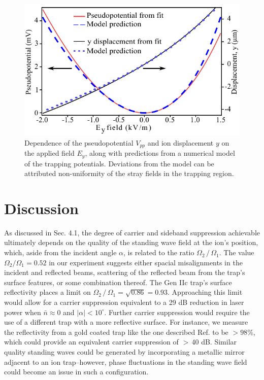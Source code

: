 \begin{figure}[htb]
    \begin{center}
        \includegraphics{figures/4/Fig_PPfit}
        \caption{\label{fig:model} Dependence of the pseudopotential $V_{pp}$ and ion displacement $y$ on the applied field $E_y$, along with predictions from a numerical model of the trapping potentials. Deviations from the model can be attributed non-uniformity of the stray fields in the trapping region. }
    \end{center}
\end{figure}




\section{Discussion}

As discussed in Sec. 4.1, the degree of carrier and sideband suppression achievable ultimately depends on the quality of the standing wave field at the ion's position, which, aside from the incident angle $\alpha$, is related to the ratio $\Omega_2\, / \, \Omega_1$. The value $\Omega_2 / \Omega_1 = 0.52$ in our experiment suggests either spacial misalignments in the incident and reflected beams, scattering of the reflected beam from the trap's surface features, or some combination thereof. The Gen IIc trap's surface reflectivity places a limit on $\Omega_2\, / \, \Omega_1=\sqrt{0.86}=0.93$. Approaching this limit would allow for a carrier suppression equivalent to a 29 dB reduction in laser power when $\bar{n}\approx0$ and $|\alpha|<10^{\circ}$. Further carrier suppression would require the use of a different trap with a more reflective surface. For instance, we measure the reflectivity from a gold coated trap like the one described Ref. \cite{Guise15.JAP.117.174901} to be $>98\%$, which could provide an equivalent carrier suppression of $>\,$40 dB. Similar quality standing waves could be generated by incorporating a metallic mirror adjacent to an ion trap--however, phase fluctuations in the standing wave field could become an issue in such a configuration.

